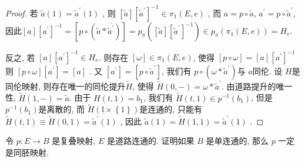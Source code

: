\documentclass[../main.tex]{subfiles}
\begin{document}
\begin{proof}
     若 \(  \tilde{a}\left( 1 \right)= \tilde{a}^{\prime} \left( 1 \right)    \) ,  则 \( [ \tilde{a}][ {\tilde{a}^{\prime} }]^{-1} \in  \pi _1 \left( E,e \right)   \) , 而 \(  a= p\circ \tilde{a}  \), \(  a^{\prime} = p\circ \tilde{a}^{\prime}   \), 因此\(  [ a][ {a^{\prime} }]^{-1} = [p\circ \left( \tilde{a}  *\overline{\tilde{a}^{\prime} } \right) ]= p_{ \pi }\left(  [ \tilde{a}][ {\tilde{a}^{\prime} }]^{-1} \right)\in p_{ \pi }\left(  \pi _1 \left( E,e \right)  \right)= H_{e}    \).
     
     反之, 若 \(   [ a][a^{\prime} ]^{-1}\in H_{e}  \). 则存在 \(  [ \omega ]\in  \pi _1 \left( E,e \right)   \), 使得 \( [p\circ  \omega   ]= [a][a^{\prime} ]^{-1}    \)   则 \(  [p\circ  \omega ][a^{\prime} ]= [a]  \) . 又 \(  [a^{\prime} ]= [p\circ \tilde{a}^{\prime} ]  \),  我们有 \(  p\circ  \left(  \omega * \tilde{a}^{\prime}  \right)   \)与 \(  a  \)同伦. 设 \(  H  \)是同伦映射, 则存在唯一的同伦提升\(  \tilde{H}  \), 使得 \(  \tilde{H}\left( 0,- \right)=  \omega * \tilde{a}^{\prime}    \). 由道路提升的唯一性,  \(  \tilde{H}\left( 1,- \right)= \tilde{a}   \). 由于 \(  H\left( t,1 \right) =  b_1  \), 我们有 \(  \tilde{H}\left( t,1 \right)\in p ^{-1} \left( b_1 \right)    \),  但是 \(  p^{-1} \left( b_1 \right)   \)是离散的, 而 \(  \tilde{H}\left( \mathbb{I}\times \left\{ 1 \right\} \right)   \)是连通的, 只能有 \(  \tilde{H}\left( t,1 \right)\equiv \tilde{H}\left( 0,1 \right)= \tilde{a}^{\prime} \left( 1 \right)     \)           , 因此 \(  \tilde{a}\left( 1 \right)= \tilde{H}\left( 1,1 \right)= \tilde{a}^{\prime} \left( 1 \right)     \) .
\end{proof}
\begin{exercise}{}{}
令 $p: E \to B$ 是复叠映射, $E$ 是道路连通的. 证明如果 $B$ 是单连通的, 那么 $p$ 一定是同胚映射.
\end{exercise}
\end{document}
